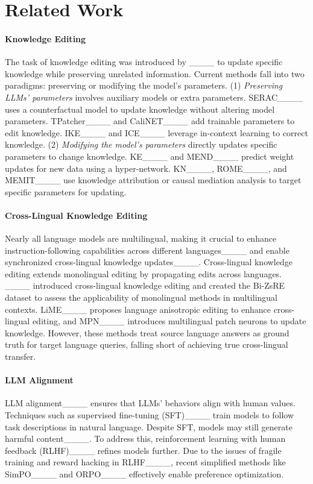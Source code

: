 \section{Related Work}
\paragraph{Knowledge Editing}  
The task of knowledge editing was introduced by ____ to update specific knowledge while preserving unrelated information. Current methods fall into two paradigms: preserving or modifying the model’s parameters.
(1) \emph{Preserving LLMs' parameters} involves auxiliary models or extra parameters. SERAC____ uses a counterfactual model to update knowledge without altering model parameters. TPatcher____ and CaliNET____ add trainable parameters to edit knowledge. IKE____ and ICE____ leverage in-context learning to correct knowledge.
(2) \emph{Modifying the model's parameters} directly updates specific parameters to change knowledge. KE____ and MEND____ predict weight updates for new data using a hyper-network. KN____, ROME____, and MEMIT____ use knowledge attribution or causal mediation analysis to target specific parameters for updating.

\paragraph{Cross-Lingual Knowledge Editing}  
Nearly all language models are multilingual, making it crucial to enhance instruction-following capabilities across different languages____ and enable synchronized cross-lingual knowledge updates____. 
Cross-lingual knowledge editing extends monolingual editing by propagating edits across languages. ____ introduced cross-lingual knowledge editing and created the Bi-ZsRE dataset to assess the applicability of monolingual methods in multilingual contexts. LiME____ proposes language anisotropic editing to enhance cross-lingual editing, and MPN____ introduces multilingual patch neurons to update knowledge. However, these methods treat source language answers as ground truth for target language queries, falling short of achieving true cross-lingual transfer.

\paragraph{LLM Alignment}  
LLM alignment____ ensures that LLMs' behaviors align with human values. Techniques such as supervised fine-tuning (SFT)____ train models to follow task descriptions in natural language. Despite SFT, models may still generate harmful content____. To address this, reinforcement learning with human feedback (RLHF)____ refines models further. Due to the issues of fragile training and reward hacking in RLHF____, recent simplified methods like SimPO____ and ORPO____ effectively enable preference optimization.